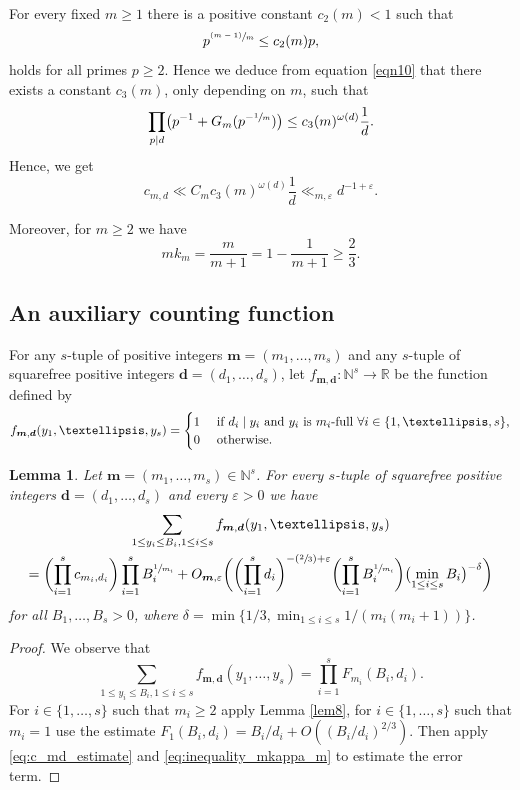 \documentclass[11pt]{article}
\numberwithin{equation}{section}
\newcommand{\Psfrac}[2]{(\sfrac{#1}{#2})}
\newcommand{\psfrac}[2]{\sfrac{(#1)}{#2}}
\let\ome\omega
\newcommand{\bfm}{{\boldsymbol{m}}}
\newcommand{\bfd}{\boldsymbol{d}}
\newcommand\NN{\mathbb{N}}
\newcommand\RR{\mathbb{R}}
\newtheorem{lemma}[theorem]{Lemma}
\theoremstyle{definition}
\numberwithin{theorem}{section}
\begin{document}
For every fixed $m\geq 1$ there is a positive constant $c_2(m)<1$ such that
\[
p^{\psfrac{m-1}{m}}\leq c_2(m) p,
\]
holds for all primes $p\geq 2$. Hence we deduce from equation \eqref{eqn10}
that there exists a constant $c_3(m)$, only depending on $m$, such that
\begin{equation}\label{eqn11}
\prod_{p\mid d} \bigl(p^{-1}+G_{m}(p^{-\sfrac{1}{m}})\bigr)
\leq c_3(m)^{\ome(d)}\frac{1}{d}.
\end{equation}
Hence, we get
\begin{equation}
\label{eq:c_md_estimate}
c_{m,d}
\ll C_m c_3(m)^{\ome(d)}\frac{1}{d}
\ll_{m,\varepsilon}d^{-1+\varepsilon}.
\end{equation}

Moreover, for $m\geq 2$ we have
\begin{equation}
\label{eq:inequality_mkappa_m}
m k_m=\frac m{m+1}=1-\frac 1{m+1}\geq \frac 23.
\end{equation}

\subsection{An auxiliary counting function}
\label{sec:counting_function_f}
For any $s$-tuple of positive integers $\bfm=(m_1,\dots,m_s)$ and any $s$-tuple of squarefree positive integers $\bfd=(d_1,\dots,d_s)$,
let $f_{\bfm, \bfd} : \NN^s \to \RR$ be the function defined by
\[
f_{\bfm, \bfd}(y_1,\dots,y_s)=\begin{cases}
1 & \text{ if $d_i\mid y_i$ and $y_i$ is $m_i$-full $ \forall i\in\{1,\dots,s\}$,}\\
0 & \text{ otherwise.}
\end{cases}
\]
\begin{lemma}
\label{lem:counting_function_f}
Let $\bfm=(m_1,\dots,m_s)\in\NN^s$. For every $s$-tuple of squarefree positive integers $\bfd=(d_1,\dots,d_s)$ and every $\varepsilon>0$ we have
\begin{multline*}
\sum_{1\leq y_i\leq B_i, 1\leq i\leq s} f_{\bfm, \bfd}(y_1,\dots,y_s) \\
=\biggl(\prod_{i=1}^s c_{m_i,d_i}\biggr)\prod_{i=1}^s B_i^{\sfrac1{m_i} }
+O_{\bfm, \varepsilon}\biggl(\biggl(\prod_{i=1}^sd_i\biggr)^{-\Psfrac23+\varepsilon}\biggl(\prod_{i=1}^s B_i^{\sfrac1{m_i}}\biggr)\bigl(\min_{1\leq i\leq s} B_i\bigr)^{-\delta}\biggr)
\end{multline*}
for all $B_1,\dots,B_s>0$,
where $\delta=\min \{ 1/3 , \min_{1\leq i\leq s}1/(m_i(m_i+1)) \}$.
\end{lemma}
\begin{proof}
We observe that
\[
\sum_{1\leq y_i\leq B_i, 1\leq i\leq s} f_{\bfm, \bfd}(y_1,\dots,y_s) = \prod_{i=1}^s F_{m_i}(B_i,d_i).
\]
For $i\in\{1,\dots,s\}$ such that $m_i\geq 2$ apply Lemma \ref{lem8}, for $i\in\{1,\dots, s\}$ such that $m_i=1$ use the estimate $F_1(B_i,d_i)= B_i/d_i + O((B_i/d_i)^{2/3})$.
Then apply \eqref{eq:c_md_estimate} and \eqref{eq:inequality_mkappa_m} to estimate the error term.
\end{proof}
\end{document}
